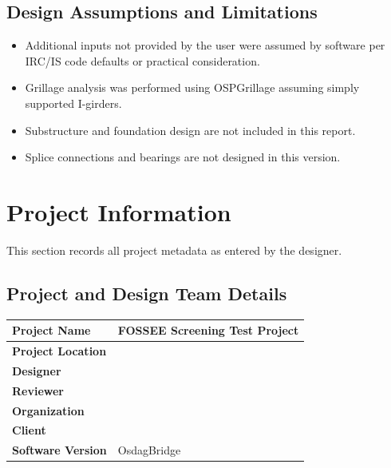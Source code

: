 \documentclass[12pt,a4paper]{report}
\numberwithin{table}{chapter}
\numberwithin{figure}{chapter}
\begin{document}
\section*{Design Assumptions and Limitations}
\label{sec:assumptions}

\begin{itemize}
\item Additional inputs not provided by the user were assumed by software per IRC/IS code defaults or practical consideration.
\item Grillage analysis was performed using OSPGrillage assuming simply supported I-girders.
\item Substructure and foundation design are not included in this report.
\item Splice connections and bearings are not designed in this version.
\end{itemize}

\titleformat{\chapter}[block]{\normalfont\Large\bfseries\centering}{\thechapter}{1em}{}
\titlespacing*{\chapter}{0pt}{-30pt}{10pt}


\chapter{Project Information}

This section records all project metadata as entered by the designer.

\section{Project and Design Team Details}
\label{sec:project-details}

\begin{tabular}{|L{5.5cm}|L{8.5cm}|}
\hline
\textbf{Project Name} & FOSSEE Screening Test Project \\
\hline
\textbf{Project Location} &  \\
\hline
\textbf{Designer} &  \\
\hline
\textbf{Reviewer} &  \\
\hline
\textbf{Organization} &  \\
\hline
\textbf{Client} &  \\
\hline
\textbf{Software Version} & OsdagBridge \\
\hline
\end{tabular}
\end{document}

